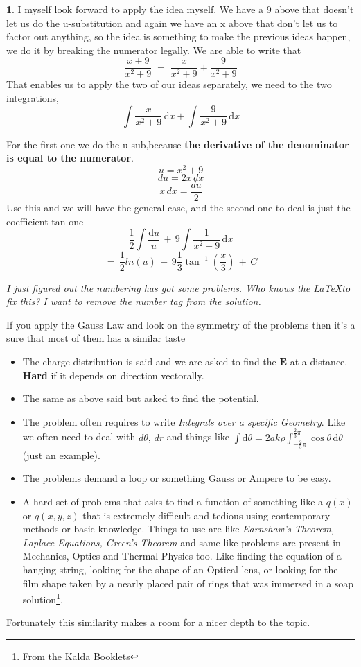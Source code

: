 \documentclass[10pt,letterpaper,twocolumn]{article}
\theoremstyle{definition}
\theoremstyle{definition}
\theoremstyle{definition}
\newtheorem{sol}{\framebox[0.07\textwidth]{Sol}}[section]
\begin{document}
\begin{sol}
I myself look forward to apply the idea myself. We have a 9 above that doesn't let us do the u-substitution and again we have an x above that don't let us to factor out anything, so the idea is something to make the previous ideas happen, we do it by breaking the numerator legally. We are able to write that
\[		\frac{x + 9}{x^{2} + 9}
		\;
		=
		\;
		\frac{x}{x^{2} + 9} 	+ 		\frac{9}{x^{2} + 9}
\]
That enables us to apply the two of our ideas separately, we need to the two integrations,
\[			\int	\frac{x}{x^{2} + 9} \, \mathrm{d} x	+
			\int	\frac{9}{x^{2} + 9} \, \mathrm{d}x  \]

For the first one we do the u-sub,because\textbf{ the derivative of the denominator is equal to the numerator}. 
\[ u = x^{2} + 9 \]
\[ du = 2x \, dx \]
\[ x \, dx = \frac{du}{2}
\]
Use this and we will have the general case, and the second one to deal is just the coefficient tan one
\[ \frac{1}{2}	\int	\frac{\mathrm{d}u }{u}
			\, + \,
	9 \int \frac{1}{ x^{2} + 9}\, \mathrm{d} x
    \]
    \[ = \, \frac{1}{2} ln(u) \, + \, 9\frac{1}{3} \tan ^{-1} (\frac{x}{3})\, +\, C	
\]
\end{sol}
\textit{I just figured out the numbering has got some problems. Who knows the \LaTeX to fix this? I want to remove the number tag from the solution. }		

If you apply the Gauss Law and look on the symmetry of the problems then it's a sure that most of them has a similar taste
\begin{itemize}
\item The charge distribution is said and we are asked to find the $\textbf{E}$ at a distance. \textbf{Hard} if it depends on direction vectorally.
\item The same as above said but asked to find the potential.
\item The problem often requires to write \emph{Integrals over a specific Geometry}. Like we often need to deal with $ d \theta, \,  dr$ and things like $ \int \mathrm{d} \theta = 2ak \rho \int_{-\frac{2}{3}\pi} ^{\frac{2}{3} \pi} \cos \theta \,\mathrm{d} \theta $ (just an example).
\item The problems demand a loop or something Gauss or Ampere to be easy.
\item A hard set of problems that asks to find a function of something like a $q(x)$ or $q(x,y,z)$ that is extremely difficult and tedious using contemporary methods or basic knowledge. Things to use are like \emph{Earnshaw's Theorem, Laplace Equations, Green's Theorem} and same like problems are present in Mechanics, Optics and Thermal Physics too. Like finding the equation of a hanging string, looking for the shape of an Optical lens, or looking for the film shape taken by a nearly placed pair of rings that was immersed in a soap solution\footnote{From the Kalda Booklets}.
\end{itemize}
Fortunately this similarity makes a room for a nicer depth to the topic.
\end{document}

